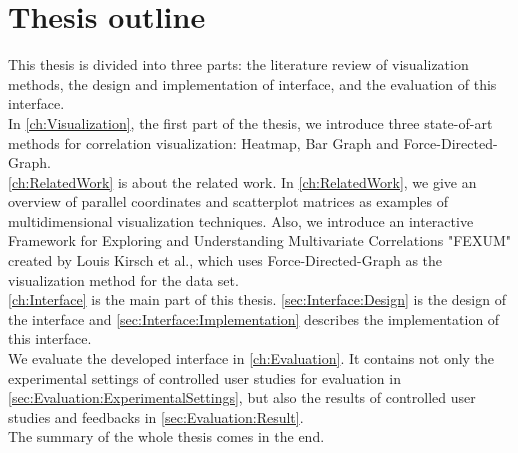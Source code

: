 \section{Thesis outline}
\label{sec:Introduction:ThesisOutline}
This thesis is divided into three parts: the literature review of visualization methods, the design and implementation of interface, and the evaluation of this interface.\\
In \autoref{ch:Visualization}, the first part of the thesis, we introduce three state-of-art methods for correlation visualization: Heatmap, Bar Graph and Force-Directed-Graph.\\
\autoref{ch:RelatedWork} is about the related work. In \autoref{ch:RelatedWork}, we give an overview\cite{Matrics} of parallel coordinates and scatterplot matrices as examples of multidimensional visualization techniques. Also, we introduce an interactive Framework for Exploring and Understanding Multivariate Correlations "FEXUM"\cite{FEXUM} created by Louis Kirsch et al., which uses Force-Directed-Graph as the visualization method for the data set.\\
\autoref{ch:Interface} is the main part of this thesis. \autoref{sec:Interface:Design} is the design of the interface and \autoref{sec:Interface:Implementation} describes the implementation of this interface.\\
We evaluate the developed interface in \autoref{ch:Evaluation}. It contains not only the experimental settings of controlled user studies for evaluation in \autoref{sec:Evaluation:ExperimentalSettings}, but also the results of controlled user studies and feedbacks in \autoref{sec:Evaluation:Result}.\\
The summary of the whole thesis comes in the end.\\